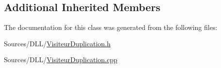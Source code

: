 \subsection*{Additional Inherited Members}


The documentation for this class was generated from the following files\+:\begin{DoxyCompactItemize}
\item 
Sources/\+D\+L\+L/\hyperlink{_visiteur_duplication_8h}{Visiteur\+Duplication.\+h}\item 
Sources/\+D\+L\+L/\hyperlink{_visiteur_duplication_8cpp}{Visiteur\+Duplication.\+cpp}\end{DoxyCompactItemize}

